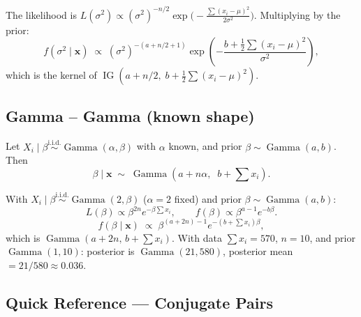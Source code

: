 \documentclass[11pt, a4paper]{article}
\newcommand{\iid}{\overset{\text{i.i.d.}}{\sim}}
\begin{document}
\begin{exbox}
The likelihood is $L(\sigma^2) \propto (\sigma^2)^{-n/2}\exp\!\bigl(-\frac{\sum(x_i-\mu)^2}{2\sigma^2}\bigr)$. Multiplying by the prior:
\[
  f(\sigma^2 \mid \mathbf{x}) \;\propto\;
  (\sigma^2)^{-(a + n/2 + 1)}\exp\!\left(-\frac{b + \frac{1}{2}\sum(x_i-\mu)^2}{\sigma^2}\right),
\]
which is the kernel of $\operatorname{IG}(a + n/2,\; b + \frac{1}{2}\sum(x_i - \mu)^2)$.
\end{exbox}

\subsection*{Gamma -- Gamma (known shape)}

\begin{thmbox}
Let $X_i \mid \beta \iid \operatorname{Gamma}(\alpha, \beta)$ with $\alpha$ known, and prior $\beta \sim \operatorname{Gamma}(a, b)$. Then
\[
  \beta \mid \mathbf{x} \;\sim\; \operatorname{Gamma}\!\left(a + n\alpha,\;\; b + \textstyle\sum x_i\right).
\]
\end{thmbox}

\begin{exbox}
With $X_i \mid \beta \iid \operatorname{Gamma}(2, \beta)$ ($\alpha = 2$ fixed) and prior $\beta \sim \operatorname{Gamma}(a, b)$:
\[
  L(\beta) \propto \beta^{2n}e^{-\beta\sum x_i},
  \qquad
  f(\beta) \propto \beta^{a-1}e^{-b\beta}.
\]
\[
  f(\beta \mid \mathbf{x}) \;\propto\; \beta^{(a+2n)-1}e^{-(b+\sum x_i)\beta},
\]
which is $\operatorname{Gamma}(a + 2n,\, b + \sum x_i)$. With data $\sum x_i = 570$, $n = 10$, and prior $\operatorname{Gamma}(1,10)$: posterior is $\operatorname{Gamma}(21, 580)$, posterior mean $= 21/580 \approx 0.036$.
\end{exbox}

\subsection*{Quick Reference --- Conjugate Pairs}
\end{document}
